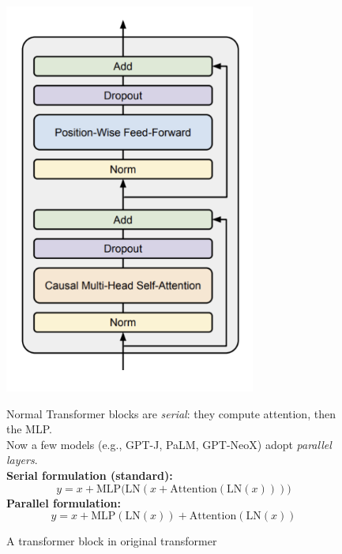 \begin{figure}[htbp]
  \centering
  \begin{minipage}{0.45\linewidth}
    \includegraphics[width=\linewidth]{figs/lec3/lec3.17.png}
    \caption{A transformer block in original transformer}
  \end{minipage}
  \hfill
  \begin{minipage}{0.5\linewidth}
    \small
      Normal Transformer blocks are \textit{serial}: they compute attention, then the MLP. \\
      Now a few models (e.g., GPT-J, PaLM, GPT-NeoX) adopt \textit{parallel layers}. \\
      \textbf{Serial formulation (standard):}  \\
      \[
        y = x + \mathrm{MLP}\bigl(\mathrm{LN}(x + \mathrm{Attention}(\mathrm{LN}(x)))\bigr)
      \]
      \textbf{Parallel formulation:}
      \[
        y = x + \mathrm{MLP}(\mathrm{LN}(x)) + \mathrm{Attention}(\mathrm{LN}(x))
      \]


\end{minipage}
\end{figure}
